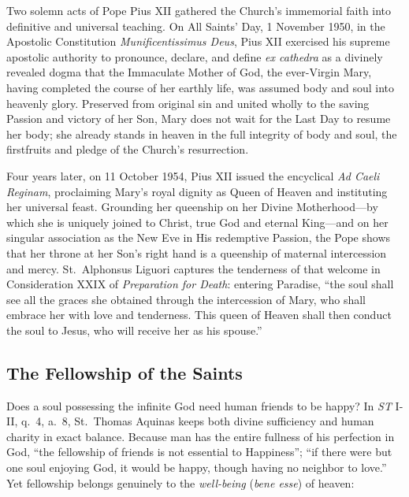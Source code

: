 Two solemn acts of Pope Pius XII gathered the Church's immemorial faith into definitive and universal teaching. On All Saints' Day, 1 November 1950, in the Apostolic Constitution \textit{Munificentissimus Deus}, Pius XII exercised his supreme apostolic authority to pronounce, declare, and define \textit{ex cathedra} as a divinely revealed dogma that the Immaculate Mother of God, the ever-Virgin Mary, having completed the course of her earthly life, was assumed body and soul into heavenly glory. Preserved from original sin and united wholly to the saving Passion and victory of her Son, Mary does not wait for the Last Day to resume her body; she already stands in heaven in the full integrity of body and soul, the firstfruits and pledge of the Church's resurrection.

Four years later, on 11 October 1954, Pius XII issued the encyclical \textit{Ad Caeli Reginam}, proclaiming Mary's royal dignity as Queen of Heaven and instituting her universal feast. Grounding her queenship on her Divine Motherhood---by which she is uniquely joined to Christ, true God and eternal King---and on her singular association as the New Eve in His redemptive Passion, the Pope shows that her throne at her Son's right hand is a queenship of maternal intercession and mercy. St.\ Alphonsus Liguori captures the tenderness of that welcome in Consideration XXIX of \textit{Preparation for Death}: entering Paradise, ``the soul shall see all the graces she obtained through the intercession of Mary, who shall embrace her with love and tenderness. This queen of Heaven shall then conduct the soul to Jesus, who will receive her as his spouse.''

\subsection*{The Fellowship of the Saints}

Does a soul possessing the infinite God need human friends to be happy? In \textit{ST} I-II, q.\ 4, a.\ 8, St.\ Thomas Aquinas keeps both divine sufficiency and human charity in exact balance. Because man has the entire fullness of his perfection in God, ``the fellowship of friends is not essential to Happiness''; ``if there were but one soul enjoying God, it would be happy, though having no neighbor to love.'' Yet fellowship belongs genuinely to the \textit{well-being} (\textit{bene esse}) of heaven:

